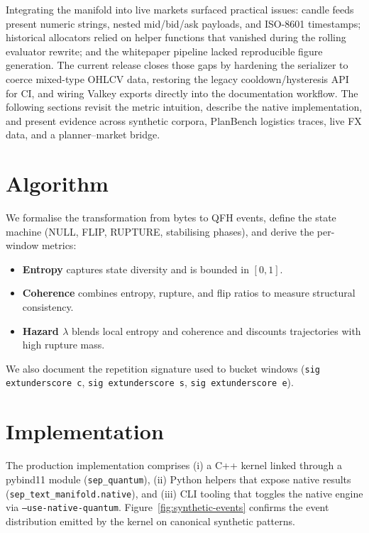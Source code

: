 \documentclass[11pt]{article}
\begin{document}
Integrating the manifold into live markets surfaced practical issues: candle feeds present numeric strings, nested mid/bid/ask payloads, and ISO-8601 timestamps; historical allocators relied on helper functions that vanished during the rolling evaluator rewrite; and the whitepaper pipeline lacked reproducible figure generation. The current release closes those gaps by hardening the serializer to coerce mixed-type OHLCV data, restoring the legacy cooldown/hysteresis API for CI, and wiring Valkey exports directly into the documentation workflow. The following sections revisit the metric intuition, describe the native implementation, and present evidence across synthetic corpora, PlanBench logistics traces, live FX data, and a planner–market bridge.

\section{Algorithm}
We formalise the transformation from bytes to QFH events, define the state machine (NULL, FLIP, RUPTURE, stabilising phases), and derive the per-window metrics:
\begin{itemize}
  \item \textbf{Entropy} captures state diversity and is bounded in $[0,1]$.
  \item \textbf{Coherence} combines entropy, rupture, and flip ratios to measure structural consistency.
  \item \textbf{Hazard $\lambda$} blends local entropy and coherence and discounts trajectories with high rupture mass.
\end{itemize}
We also document the repetition signature used to bucket windows (\texttt{sig	extunderscore c}, \texttt{sig	extunderscore s}, \texttt{sig	extunderscore e}).

\section{Implementation}
The production implementation comprises (i) a C++ kernel linked through a pybind11 module (\texttt{sep\_quantum}), (ii) Python helpers that expose native results (\texttt{sep\_text\_manifold.native}), and (iii) CLI tooling that toggles the native engine via \texttt{--use-native-quantum}. Figure~\ref{fig:synthetic-events} confirms the event distribution emitted by the kernel on canonical synthetic patterns.
\end{document}
